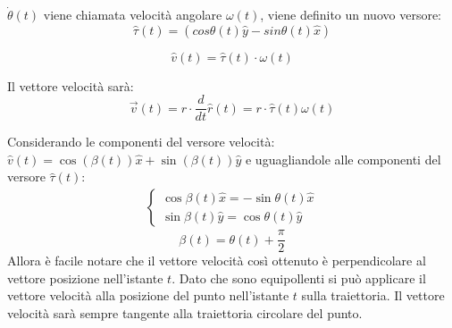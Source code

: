 \documentclass{article}
\numberwithin{equation}{subsection}
\begin{document}
$\dot\theta(t)$ viene chiamata velocità angolare $\omega(t)$, 
viene definito un nuovo versore:
\begin{equation}
    \hat{\tau}(t) =\left(cos\theta(t)\hat{y}-sin\theta(t)\hat{x}\right)
\end{equation}

\begin{equation}
    \hat{v}(t) =\hat{\tau}(t)\cdot\omega(t)
\end{equation}

Il vettore velocità sarà: 
\begin{equation}
    \vec{v}(t)=r\cdot\frac{d}{dt}\hat{r}(t)=r\cdot\hat{\tau}(t)\omega(t)
\end{equation}


Considerando le componenti del versore velocità: 
$\hat{v}(t)=\cos(\beta(t))\hat{x}+\sin(\beta(t))\hat{y}$ e 
uguagliandole alle componenti del versore $\hat{\tau}(t)$: 
\begin{gather*}
    \begin{cases}
        \cos\beta(t)\hat{x}=-\sin\theta(t)\hat{x}\\
        \sin\beta(t)\hat{y}=\cos\theta(t)\hat{y}
    \end{cases}
\end{gather*}
\begin{equation}
    \beta(t)=\theta(t)+\displaystyle\frac{\pi}{2}
\end{equation}
Allora è 
facile notare che il vettore velocità così ottenuto è 
perpendicolare al vettore posizione nell'istante $t$. Dato che  
sono equipollenti si può applicare il vettore velocità 
alla posizione del punto nell'istante $t$ sulla traiettoria.
Il vettore velocità sarà sempre tangente alla traiettoria 
circolare del punto.
\end{document}
